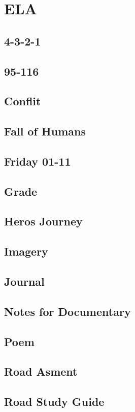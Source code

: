\section{ELA}
\subsection{4-3-2-1}

\subsection{95-116}

\subsection{Conflit}

\subsection{Fall of Humans}

\subsection{Friday 01-11}

\subsection{Grade}

\subsection{Heros Journey}

\subsection{Imagery}

\subsection{Journal}

\subsection{Notes for Documentary}

\subsection{Poem}

\subsection{Road Asment}

\subsection{Road Study Guide}

